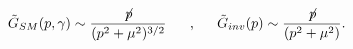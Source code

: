 \begin{equation}
\tilde{G}_{SM}(p,\gamma)\sim \frac{\not\! p}{(p^2+\mu^2)^{3/2}}
 \makebox[.5in]{,}
\tilde{G}_{inv}(p)\sim \frac{\not\! p}{(p^2+\mu^2)}.
\label{IRp}
\end{equation}


